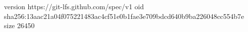 version https://git-lfs.github.com/spec/v1
oid sha256:13aac21a04f075221483ac4cf51e0b1fae3e709bdcd640b9ba226048cc554b7e
size 26450
